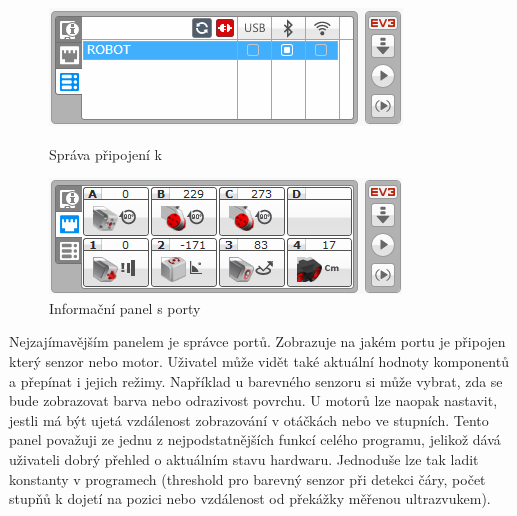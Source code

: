 \begin{figure}[h]
	\begin{minipage}[b]{.48\textwidth}
		\centering
		\includegraphics[width=\textwidth]{images/lego-soft/lego-soft_brick-manager_connected.png}
		\caption{Správa připojení k }
		\label{fig:lego-soft_brick-manager-connected}
	\end{minipage}
	\hfill
	\begin{minipage}[b]{.48\textwidth}
		\centering
		\includegraphics[width=\textwidth]{images/lego-soft/lego-soft_brick_port-view.png}
		\caption{Informační panel s porty}
		\label{fig:lego-soft_brick_port-view}
	\end{minipage}
\end{figure}
Nejzajímavějším panelem je správce portů. 
Zobrazuje na jakém portu je připojen který senzor nebo motor. 
Uživatel může vidět také aktuální hodnoty komponentů a přepínat i jejich režimy.    
Například u barevného senzoru si může vybrat, zda se bude zobrazovat barva nebo odrazivost povrchu. U motorů lze naopak nastavit, jestli má být ujetá vzdálenost zobrazování v otáčkách nebo ve stupních. 
Tento panel považuji ze jednu z nejpodstatnějších funkcí celého programu, jelikož dává uživateli dobrý přehled o aktuálním stavu hardwaru. 
Jednoduše lze tak ladit konstanty v programech (threshold pro barevný senzor při detekci čáry, počet stupňů k dojetí na pozici nebo vzdálenost od překážky měřenou ultrazvukem).
% 
% 
\\

